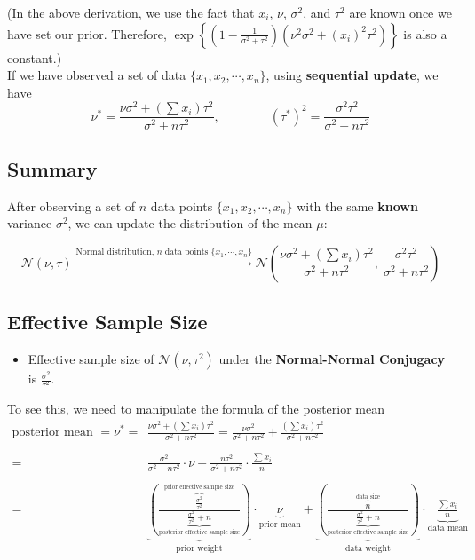 \documentclass{article}
\def\dsst{\displaystyle}
\begin{document}
(In the above derivation, we use the fact that $x_i$, $\nu$, $\sigma^2$, and $\tau^2$ are known once we have set our prior. Therefore, $\dsst \exp\left\{(1-\frac{1}{\sigma^2+\tau^2})(\nu^2\sigma^2+(x_i)^2\tau^2) \right\}$ is also a constant.)\\

If we have observed a set of data $\{x_1, x_2,\cdots,x_n \}$, using \textbf{sequential update}, we have
$$ \nu^* = \frac{\nu\sigma^2+\left(\sum x_i\right)\tau^2}{\sigma^2+n\tau^2},\qquad \qquad (\tau^*)^2 = \frac{\sigma^2\tau^2}{\sigma^2+n\tau^2} $$

\subsection{Summary}

After observing a set of $n$ data points $\{x_1, x_2, \cdots, x_n\}$ with the same \textbf{known} variance $\sigma^2$, we can update the distribution of the mean $\mu$:

$$ \mathcal{N}(\nu, \tau)\xrightarrow{\text{Normal distribution, $n$ data points $\{x_1, \cdots, x_n\}$}} \mathcal{N}\left(\frac{\nu\sigma^2+\left(\sum x_i\right)\tau^2}{\sigma^2+n\tau^2},\ \frac{\sigma^2\tau^2}{\sigma^2+n\tau^2}\right) $$

\subsection{Effective Sample Size}

\begin{itemize}
	\item Effective sample size of $\mathcal{N}(\nu, \tau^2)$ under the \textbf{Normal-Normal Conjugacy} is $\dsst \frac{\sigma^2}{\tau^2}$.
\end{itemize}

To see this, we need to manipulate the formula of the posterior mean
\begin{align*}
\text{posterior mean }=\nu^* = & \frac{\nu\sigma^2+(\sum x_i)\tau^2}{\sigma^2+n\tau^2} = \frac{\nu\sigma^2}{\sigma^2+n\tau^2} + \frac{\left(\sum x_i\right)\tau^2}{\sigma^2+n\tau^2}\\
& \\
 = & \frac{\sigma^2}{\sigma^2+n\tau^2}\cdot \nu + \frac{n\tau^2}{\sigma^2+n\tau^2}\cdot \frac{\sum x_i}{n} \\
& \\
= & \underbrace{\left(\frac{\overbrace{\frac{\sigma^2}{\tau^2}}^\text{prior effective sample size}}{\underbrace{\frac{\sigma^2}{\tau^2}+n}_\text{posterior effective sample size}}\right)}_\text{prior weight}\cdot \underbrace{\nu}_\text{prior mean} + \underbrace{\left(\frac{\overbrace{n}^\text{data size}}{\underbrace{\frac{\sigma^2}{\tau^2}+n}_\text{posterior effective sample size}}\right)}_\text{data weight}\cdot \underbrace{\frac{\sum x_i}{n}}_\text{data mean}
\end{align*}
\end{document}
